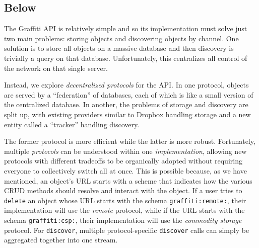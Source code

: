 \subsection{Below}

The Graffiti API is relatively simple
and so its implementation must solve just two main problems:
storing objects and discovering objects by channel.
One solution is to store all objects on a massive database
and then discovery is trivially a query on that database.
Unfortunately, this centralizes all control of the network
on that single server.

Instead, we explore \emph{decentralized protocols} for the API.
In one protocol, objects are served by a ``federation'' of databases,
each of which is like a small version of the centralized database.
In another, the problems of storage and discovery are split up,
with existing providers similar to Dropbox handling storage
and a new entity called a ``tracker'' handling discovery.

The former protocol is more efficient while the latter is more robust.
Fortunately, multiple \emph{protocols} can be understood within one \emph{implementation},
allowing new protocols
with different tradeoffs to be organically adopted without requiring
everyone to collectively switch all at once.
This is possible because, as we have mentioned, an object's URL starts with a scheme that indicates
how the various CRUD methods should resolve and interact with the object.
If a user tries to \texttt{delete} an object whose URL starts with the schema
\texttt{graffiti:remote:}, their implementation will use the \emph{remote}
protocol, while if the URL starts with the schema \texttt{graffiti:csp:},
their implementation will use the \emph{commodity storage} protocol.
For \texttt{discover}, multiple protocol-specific \texttt{discover}
calls can simply be aggregated together into one stream.

